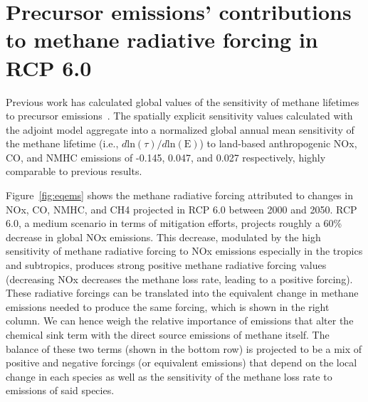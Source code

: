 \section{Precursor emissions' contributions to methane radiative forcing in RCP 6.0}

Previous work has calculated global values of the sensitivity of methane lifetimes to precursor emissions~\citep{ref:fry2012,ref:holmes2013}. The spatially explicit sensitivity values calculated with the adjoint model aggregate into a normalized global annual mean sensitivity of the methane lifetime (i.e., $d \mathrm{ln}(\tau)/d\mathrm{ln}(\mathrm{E})$) to land-based anthropogenic NOx, CO, and NMHC emissions of -0.145, 0.047, and 0.027 respectively, highly comparable to previous results.


Figure~\ref{fig:eqems} shows the methane radiative forcing attributed to changes in NOx, CO, NMHC, and CH4 projected in RCP 6.0 between 2000 and 2050. RCP 6.0, a medium scenario in terms of mitigation efforts, projects roughly a 60\% decrease in global NOx emissions. This decrease, modulated by the high sensitivity of methane radiative forcing to NOx emissions especially in the tropics and subtropics, produces strong positive methane radiative forcing values (decreasing NOx decreases the methane loss rate, leading to a positive forcing). These radiative forcings can be translated into the equivalent change in methane emissions needed to produce the same forcing, which is shown in the right column. We can hence weigh the relative importance of emissions that alter the chemical sink term with the direct source emissions of methane itself. The balance of these two terms (shown in the bottom row) is projected to be a mix of positive and negative forcings (or equivalent emissions) that depend on the local change in each species as well as the sensitivity of the methane loss rate to emissions of said species.

